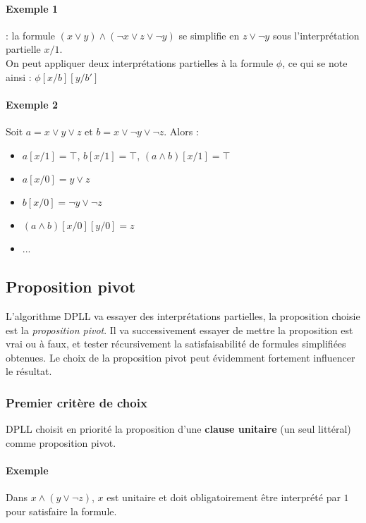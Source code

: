 \documentclass[a4paper]{article}
\begin{document}
    \paragraph{Exemple 1} : la formule $(x \lor y) \land (\lnot x \lor z \lor \lnot y)$ se simplifie
    en $z \lor \lnot y $ sous l'interprétation partielle $x/1$.\\

  On peut appliquer deux interprétations partielles à la formule $\phi$, ce qui se
  note ainsi : $\phi[x/b][y/b']$

    \paragraph{Exemple 2} Soit $a = x \lor y \lor z$ et $b = x \lor \lnot y \lor \lnot z$. Alors :
    \begin{itemize}
      \item $a[x/1] = \top$, $b[x/1] = \top$, $(a \land b)[x/1] = \top$
      \item $a[x/0] = y \lor z$
      \item $b[x/0] = \lnot y \lor \lnot z$
      \item $(a \land b)[x/0][y/0] = z$
      \item ...
    \end{itemize}

  \subsection{Proposition pivot}
  L'algorithme DPLL va essayer des interprétations partielles, la proposition choisie
  est la \textit{proposition pivot}. Il va successivement essayer de mettre la 
  proposition est vrai ou à faux, et tester récursivement la satisfaisabilité de formules
  simplifiées obtenues. Le choix de la proposition pivot peut évidemment fortement
  influencer le résultat.

  \subsubsection{Premier critère de choix}
  DPLL choisit en priorité la proposition d'une \textbf{clause unitaire} (un seul littéral)
  comme proposition pivot. 

  \paragraph{Exemple} Dans $x \land (y \lor \lnot z)$, $x$ est unitaire et doit 
  obligatoirement être interprété par $1$ pour satisfaire la formule.
\end{document}
